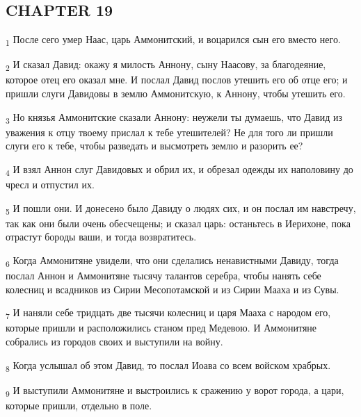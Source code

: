 \subsection{CHAPTER 19}
\begin{tcolorbox}
\textsubscript{1} После сего умер Наас, царь Аммонитский, и воцарился сын его вместо него.
\end{tcolorbox}
\begin{tcolorbox}
\textsubscript{2} И сказал Давид: окажу я милость Аннону, сыну Наасову, за благодеяние, которое отец его оказал мне. И послал Давид послов утешить его об отце его; и пришли слуги Давидовы в землю Аммонитскую, к Аннону, чтобы утешить его.
\end{tcolorbox}
\begin{tcolorbox}
\textsubscript{3} Но князья Аммонитские сказали Аннону: неужели ты думаешь, что Давид из уважения к отцу твоему прислал к тебе утешителей? Не для того ли пришли слуги его к тебе, чтобы разведать и высмотреть землю и разорить ее?
\end{tcolorbox}
\begin{tcolorbox}
\textsubscript{4} И взял Аннон слуг Давидовых и обрил их, и обрезал одежды их наполовину до чресл и отпустил их.
\end{tcolorbox}
\begin{tcolorbox}
\textsubscript{5} И пошли они. И донесено было Давиду о людях сих, и он послал им навстречу, так как они были очень обесчещены; и сказал царь: останьтесь в Иерихоне, пока отрастут бороды ваши, и тогда возвратитесь.
\end{tcolorbox}
\begin{tcolorbox}
\textsubscript{6} Когда Аммонитяне увидели, что они сделались ненавистными Давиду, тогда послал Аннон и Аммонитяне тысячу талантов серебра, чтобы нанять себе колесниц и всадников из Сирии Месопотамской и из Сирии Мааха и из Сувы.
\end{tcolorbox}
\begin{tcolorbox}
\textsubscript{7} И наняли себе тридцать две тысячи колесниц и царя Мааха с народом его, которые пришли и расположились станом пред Медевою. И Аммонитяне собрались из городов своих и выступили на войну.
\end{tcolorbox}
\begin{tcolorbox}
\textsubscript{8} Когда услышал об этом Давид, то послал Иоава со всем войском храбрых.
\end{tcolorbox}
\begin{tcolorbox}
\textsubscript{9} И выступили Аммонитяне и выстроились к сражению у ворот города, а цари, которые пришли, отдельно в поле.
\end{tcolorbox}
